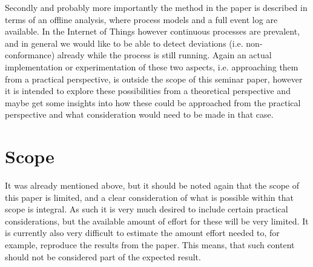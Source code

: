 \documentclass[runningheads]{template/llncs}
\begin{document}
Secondly and probably more importantly the method in the paper is described in terms of an offline analysis, where process models and a full event log are available. In the Internet of Things however continuous processes are prevalent, and in general we would like to be able to detect deviations (i.e. non-conformance) already while the process is still running.
Again an actual implementation or experimentation of these two aspects, i.e. approaching them from a practical perspective, is outside the scope of this seminar paper, however it is intended to explore these possibilities from a theoretical perspective and maybe get some insights into how these could be approached from the practical perspective and what consideration would need to be made in that case.
\section{Scope}
It was already mentioned above, but it should be noted again that the scope of this paper is limited, and a clear consideration of what is possible within that scope is integral.
As such it is very much desired to include certain practical considerations, but the available amount of effort for these will be very limited.
It is currently also very difficult to estimate the amount effort needed to, for example, reproduce the results from the paper.
This means, that such content should not be considered part of the expected result.
%
%
%


%
\end{document}
